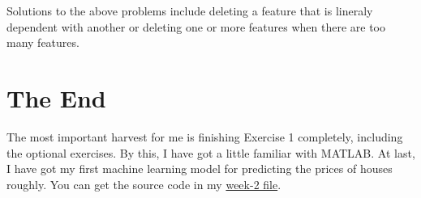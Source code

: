 \documentclass[11pt]{article}
\begin{document}
		Solutions to the above problems include deleting a feature that is lineraly dependent with another or deleting one or more features when there are too many features.

	\section{The End} 
		The most important harvest for me is finishing Exercise 1 completely, including the optional exercises. By this, I have got a little familiar with MATLAB. At last, I have got my first machine learning model for predicting the prices of houses roughly. You can get the source code in my \underline{week-2 file}.
\end{document}
